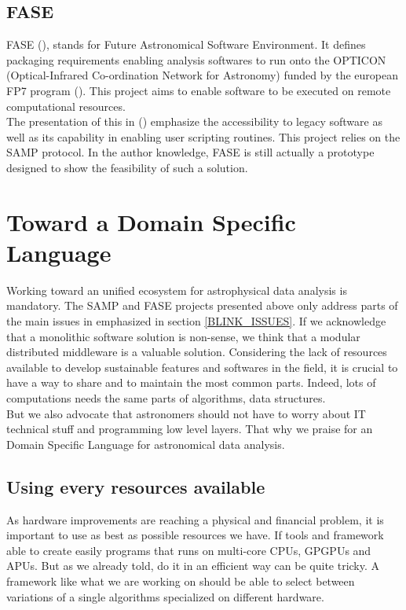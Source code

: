 		\subsection{FASE}
			FASE (\cite{Granet}), stands for Future Astronomical Software Environment.
			It defines packaging requirements enabling analysis softwares to run onto the OPTICON (Optical-Infrared Co-ordination Network for Astronomy) funded by the european FP7 program (\cite{Fase}).
			This project aims to enable software to be executed on remote computational resources.
			\\
			The presentation of this in (\cite{Grosbol}) emphasize the accessibility to legacy software as well as its capability in enabling user scripting routines.
			This project relies on the SAMP protocol.
			In the author knowledge, FASE is still actually a prototype designed to show the feasibility of such a solution.

	\section{Toward a Domain Specific Language}
		Working toward an unified ecosystem for astrophysical data analysis is mandatory.
		The SAMP and FASE projects presented above only address parts of the main issues in emphasized in section \ref{BLINK_ISSUES}.
		If we acknowledge that a monolithic software solution is non-sense, we think that a modular distributed middleware is a valuable solution.
		Considering the lack of resources available to develop sustainable features and softwares in the field, it is crucial to have a way to share and to maintain the most common parts.
		Indeed, lots of computations needs the same parts of algorithms, data structures.
		\\
		But we also advocate that astronomers should not have to worry about IT technical stuff and programming low level layers.
		That why we praise for an Domain Specific Language for astronomical data analysis.

		\subsection{Using every resources available}
			As hardware improvements are reaching a physical and financial problem, it is important to use as best as possible resources we have.
			If tools and framework able to create easily programs that runs on multi-core CPUs, GPGPUs and APUs.
			But as we already told, do it in an efficient way can be quite tricky.
			A framework like what we are working on should be able to select between variations of a single algorithms specialized on different hardware.

